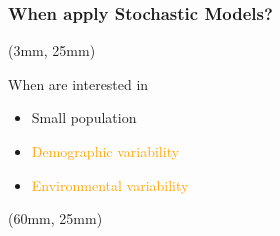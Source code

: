 \begin{frame}
    \frametitle{When apply Stochastic Models?}
    \begin{textblock*}{45mm}(3mm, 25mm)
        \begin{greenbox}{When are interested in}
            \begin{itemize}
                \item
                    Small population
                \item
                    \textcolor<2>{orange}{
                        Demographic variability
                    }
                \item
                    \textcolor<3>{orange}{
                        Environmental variability
                    }
            \end{itemize}
        \end{greenbox}
    \end{textblock*}
    \begin{textblock*}{60mm}(60mm, 25mm)
        \begin{bluebox}{
        }
        \end{bluebox}
    \end{textblock*}
\end{frame}
